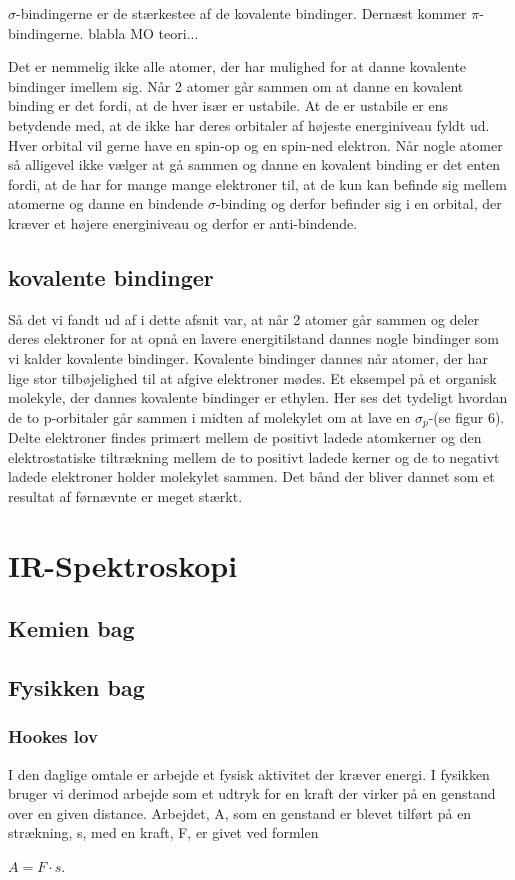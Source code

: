 \documentclass[12pt,a4paper]{article}
\theoremstyle{break}
\theoremstyle{nonumberplain}
\begin{document}
$\sigma$-bindingerne er de stærkestee af de kovalente bindinger. Dernæst kommer $\pi$-bindingerne. blabla MO teori...


Det er nemmelig ikke alle atomer, der har mulighed for at danne kovalente bindinger imellem sig. Når 2 atomer går sammen om at danne en kovalent binding er det fordi, at de hver især er ustabile. At de er ustabile er ens betydende med, at de ikke har deres orbitaler af højeste energiniveau fyldt ud. Hver orbital vil gerne have en spin-op og en spin-ned elektron. Når nogle atomer så alligevel ikke vælger at gå sammen og danne en kovalent binding er det enten fordi, at de har for mange mange elektroner til, at de kun kan befinde sig mellem atomerne og danne en bindende $\sigma$-binding og derfor befinder sig i en orbital, der kræver et højere energiniveau og derfor er anti-bindende. 

\subsection{kovalente bindinger}
Så det vi fandt ud af i dette afsnit var, at når 2 atomer går sammen og deler deres elektroner for at opnå en lavere energitilstand dannes nogle bindinger som vi kalder kovalente bindinger. Kovalente bindinger dannes når atomer, der har lige stor tilbøjelighed til at afgive elektroner mødes. Et eksempel på et organisk molekyle, der dannes kovalente bindinger er ethylen. Her ses det tydeligt hvordan de to p-orbitaler går sammen i midten af molekylet om at lave en $\sigma_p$-(se figur 6). Delte elektroner findes primært mellem de positivt ladede atomkerner og den elektrostatiske tiltrækning mellem de to positivt ladede kerner og de to negativt ladede elektroner holder molekylet sammen. Det bånd der bliver dannet som et resultat af førnævnte er meget stærkt.

\section{IR-Spektroskopi}

\subsection{Kemien bag}

\subsection{Fysikken bag}

\subsubsection{Hookes lov}
I den daglige omtale er arbejde et fysisk aktivitet der kræver energi. I fysikken bruger vi derimod arbejde som et udtryk for en kraft der virker på en genstand over en given distance. Arbejdet, A, som en genstand er blevet tilført på en strækning, s, med en kraft, F, er givet ved formlen
\\
\begin{center}
 $A=F \cdot s$. 
\end{center}
\bigskip
\end{document}
